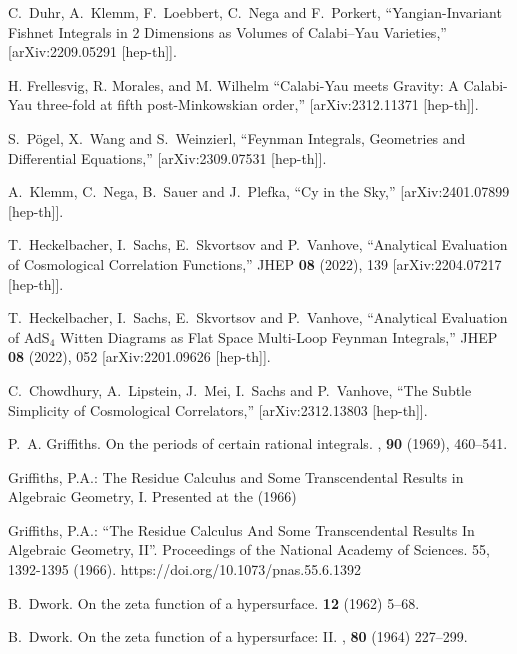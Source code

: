 \documentclass[a4paper,12pt]{article}
\numberwithin{equation}{section}
\numberwithin{figure}{section}
\begin{document}
\begin{thebibliography}{99}
C.~Duhr, A.~Klemm, F.~Loebbert, C.~Nega and F.~Porkert,
``Yangian-Invariant Fishnet Integrals in 2 Dimensions as Volumes of Calabi--Yau Varieties,''
[arXiv:2209.05291 [hep-th]].

H. Frellesvig, R. Morales, and M. Wilhelm
``Calabi-Yau meets Gravity: A Calabi-Yau three-fold at fifth post-Minkowskian order,''
[arXiv:2312.11371 [hep-th]].

S.~P\"ogel, X.~Wang and S.~Weinzierl,
``Feynman Integrals, Geometries and Differential Equations,''
[arXiv:2309.07531 [hep-th]].

A.~Klemm, C.~Nega, B.~Sauer and J.~Plefka,
``Cy in the Sky,''
[arXiv:2401.07899 [hep-th]].


T.~Heckelbacher, I.~Sachs, E.~Skvortsov and P.~Vanhove,
``Analytical Evaluation of Cosmological Correlation Functions,''
JHEP \textbf{08} (2022), 139
[arXiv:2204.07217 [hep-th]].

T.~Heckelbacher, I.~Sachs, E.~Skvortsov and P.~Vanhove,
``Analytical Evaluation of AdS$_{4}$ Witten Diagrams as Flat Space Multi-Loop Feynman Integrals,''
JHEP \textbf{08} (2022), 052
[arXiv:2201.09626 [hep-th]].

C.~Chowdhury, A.~Lipstein, J.~Mei, I.~Sachs and P.~Vanhove,
``The Subtle Simplicity of Cosmological Correlators,''
[arXiv:2312.13803 [hep-th]].


P.~A. Griffiths.
\newblock On the periods of certain rational integrals.
, {\bf 90} (1969), 460--541.


   Griffiths, P.A.: The Residue Calculus and Some
    Transcendental Results in Algebraic Geometry, I. Presented at the
    (1966)

    Griffiths, P.A.: ``The Residue Calculus And Some Transcendental
    Results In Algebraic Geometry, II''. Proceedings of the National
    Academy of Sciences. 55, 1392-1395
    (1966). https://doi.org/10.1073/pnas.55.6.1392 

B.~Dwork.
\newblock On the zeta function of a hypersurface.
 {\bf 12} (1962) 5--68.

B.~Dwork.
\newblock On the zeta function of a hypersurface: {{II}}.
, {\bf 80} (1964) 227--299.
  

\end{thebibliography}
\end{document}
